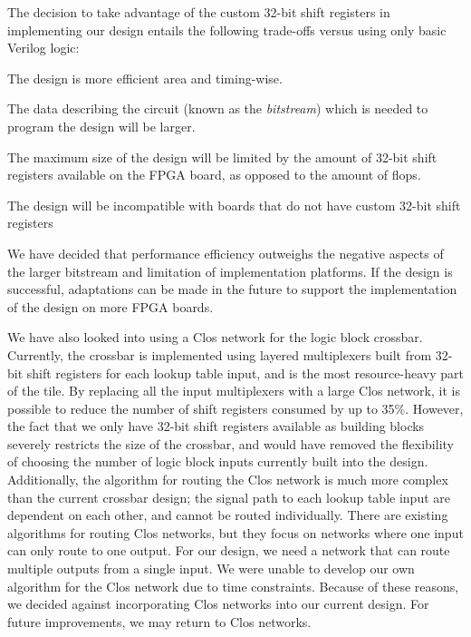 The decision to take advantage of the custom 32-bit shift registers in implementing our design entails the following trade-offs versus using only basic Verilog logic:
\begin{itemlist}
	\item The design is more efficient area and timing-wise.
	\item The data describing the circuit (known as the \emph{bitstream}) which is needed to program the design will be larger.
	\item The maximum size of the design will be limited by the amount of 32-bit shift registers available on the FPGA board, as opposed to the amount of flops.
	\item The design will be incompatible with boards that do not have custom 32-bit shift registers
\end{itemlist}

We have decided that performance efficiency outweighs the negative aspects of the larger bitstream and limitation of implementation platforms.
If the design is successful, adaptations can be made in the future to support the implementation of the design on more FPGA boards.

We have also looked into using a Clos network for the logic block crossbar.
Currently, the crossbar is implemented using layered multiplexers built from 32-bit shift registers for each lookup table input, and is the most resource-heavy part of the tile.
By replacing all the input multiplexers with a large Clos network, it is possible to reduce the number of shift registers consumed by up to 35\%.
However, the fact that we only have 32-bit shift registers available as building blocks severely restricts the size of the crossbar, and would have removed the flexibility of choosing the number of logic block inputs currently built into the design.
Additionally, the algorithm for routing the Clos network is much more complex than the current crossbar design; the signal path to each lookup table input are dependent on each other, and cannot be routed individually.
There are existing algorithms for routing Clos networks, but they focus on networks where one input can only route to one output.
For our design, we need a network that can route multiple outputs from a single input.
We were unable to develop our own algorithm for the Clos network due to time constraints.
Because of these reasons, we decided against incorporating Clos networks into our current design.
For future improvements, we may return to Clos networks.


